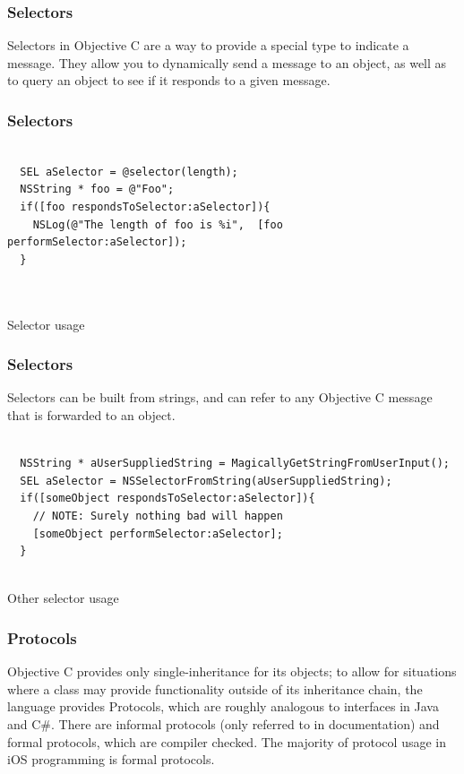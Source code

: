 \documentclass[10pt]{beamer}
\begin{document}
    
\begin{frame}[fragile]
  \frametitle{Selectors}
  Selectors in Objective C are a way to provide a special type to indicate a message. They allow you to dynamically send a message to an object, as well as to query an object to see if it responds to a given message.

\end{frame}

\begin{frame}[fragile]
  \frametitle{Selectors}
  \begin{listing}[H]
    \begin{verbatim}
  
  SEL aSelector = @selector(length);
  NSString * foo = @"Foo";
  if([foo respondsToSelector:aSelector]){
    NSLog(@"The length of foo is %i",  [foo performSelector:aSelector]);
  }
  
              
  \end{verbatim}
    \caption{Selector usage}
    \label{listing:13}
  \end{listing}

\end{frame}

\begin{frame}[fragile]
  \frametitle{Selectors}
  Selectors can be built from strings, and can refer to any Objective C message that is forwarded to an object. \begin{listing}[H]
    \begin{verbatim}
  
  NSString * aUserSuppliedString = MagicallyGetStringFromUserInput();
  SEL aSelector = NSSelectorFromString(aUserSuppliedString);
  if([someObject respondsToSelector:aSelector]){
    // NOTE: Surely nothing bad will happen
    [someObject performSelector:aSelector];
  }
              
  \end{verbatim}
    \caption{Other selector usage}
    \label{listing:14}
  \end{listing}

\end{frame}

    
\begin{frame}[fragile]
  \frametitle{Protocols}
  Objective C provides only single-inheritance for its objects; to allow for situations where a class may provide functionality outside of its inheritance chain, the language provides Protocols, which are roughly analogous to interfaces in Java and C\#.  There are informal protocols (only referred to in documentation) and formal protocols, which are compiler checked.  The majority of protocol usage in iOS programming is formal protocols.

\end{frame}
\end{document}

